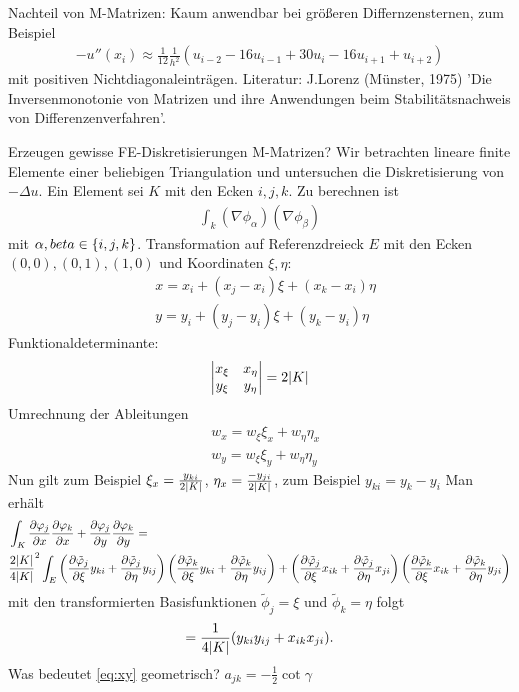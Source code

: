 Nachteil von M-Matrizen: Kaum anwendbar bei größeren Differnzensternen, zum Beispiel
\begin{align*}
  - u''(x_i) \approx \frac 1 {12} \frac 1 {h^2}(u_{i-2}-16u_{i-1} + 30 u_i - 16 u_{i+1} + u_{i+2})
\end{align*}
mit positiven Nichtdiagonaleinträgen. Literatur: J.Lorenz (Münster, 1975) 'Die Inversenmonotonie von Matrizen und ihre Anwendungen beim Stabilitätsnachweis von Differenzenverfahren'.

Erzeugen gewisse FE-Diskretisierungen M-Matrizen? Wir betrachten lineare finite Elemente einer beliebigen Triangulation und untersuchen die Diskretisierung von $- \Delta u$. Ein Element sei $K$ mit den Ecken $i, j, k$. Zu berechnen ist 
\begin{align*}
  \int_k (\nabla \phi_\alpha) (\nabla \phi_\beta)
\end{align*}
mit $\alpha, beta \in \left\{ i, j, k \right\}$. Transformation auf Referenzdreieck $E$ mit den Ecken $(0,0),(0,1), (1, 0)$ und Koordinaten $\xi, \eta$: 
\begin{align*}
  & x = x_i + (x_j - x_i)\xi + (x_k - x_i) \eta\\
  & y = y_i + (y_j - y_i)\xi + (y_k - y_i) \eta
\end{align*}
Funktionaldeterminante:
\begin{align*}
  \begin{vmatrix}
    x_\xi & x_\eta\\
y_\xi & y_\eta
  \end{vmatrix} = 2 |K|
\end{align*}
Umrechnung der Ableitungen
\begin{align*}
&  w_x = w_\xi \xi_x + w_\eta\eta_x\\
&  w_y = w_\xi \xi_y + w_\eta\eta_y
\end{align*}
Nun gilt zum Beispiel $\xi_x = \frac {y_{ki}}{2 |K|}$, $\eta_x = \frac {-y_{ji}}{2 |K|}$, zum Beispiel $y_{ki} = y_k - y_i$
Man erhält 
\begin{align*}
&  \int_K \frac{\partial \varphi_j}{\partial x} \frac{\partial \varphi_k}{\partial x} + \frac{\partial \varphi_j}{\partial y} \frac{\partial \varphi_k}{\partial y} =\\
& \frac{2 |K|}{4 |K|}^2 \int_E \left( \frac{\partial \tilde {\varphi}_j}{\partial \xi} y_{ki} + \frac{\partial \tilde {\varphi}_j}{\partial \eta} y_{ij} \right)\left( \frac{\partial \tilde {\varphi}_k}{\partial \xi} y_{ki} + \frac{\partial \tilde {\varphi}_k}{\partial \eta} y_{ij} \right) +
\left( \frac{\partial \tilde {\varphi}_j}{\partial \xi} x_{ik} + \frac{\partial \tilde {\varphi}_j}{\partial \eta} x_{ji} \right)\left( \frac{\partial \tilde {\varphi}_k}{\partial \xi} x_{ik} + \frac{\partial \tilde {\varphi}_k}{\partial \eta} y_{ji} \right)
\end{align*}
mit den transformierten Basisfunktionen $\tilde \phi_j = \xi$ und $\tilde \phi_k = \eta$ folgt
\begin{align}\label{eq:xy}
   = \frac 1 {4 |K|}(y_{ki}y_{ij} + x_{ik} x_{ji}).
\end{align}
Was bedeutet \eqref{eq:xy} geometrisch? $a_{jk} = - \frac 1 2 \cot \gamma$

